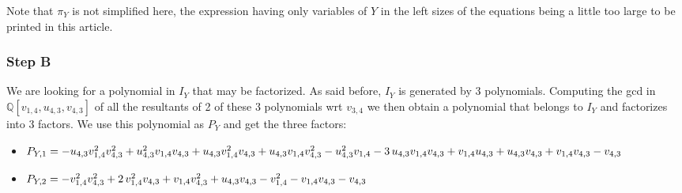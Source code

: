 Note that $\pi_{Y}$ is not simplified here, the expression having only
variables of $Y$ in the left sizes of the equations being a little too large
to be printed in this article.

\subsubsection{{\bf Step B}}

We are looking for a polynomial in $I_Y$ that may be factorized. As said before, $I_Y$ is generated by $3$ polynomials. Computing the gcd in $\mathbb{Q} [ v_{1,4} ,u_{4,3} ,v_{4,3} ]$ of all the resultants of 2 of these $3$ polynomials wrt $v_{3,4}$ we then obtain a
polynomial that belongs to $I_{Y}$ and factorizes into $3$ factors. We use this polynomial as $P_{Y}$ and get the three factors:
\begin{itemize}
  \item {\small{$P_{Y,1} =-u_{4,3} v_{1,4}^{2} v_{4,3}^{2} +u_{4,3}^{2} v_{1,4}
  v_{4,3} +u_{4,3} v_{1,4}^{2} v_{4,3} +u_{4,3} v_{1,4} v_{4,3}^{2}
  -u_{4,3}^{2} v_{1,4} -3 \hspace{0.17em} u_{4,3} v_{1,4} v_{4,3} +v_{1,4}
  u_{4,3} +u_{4,3} v_{4,3} +v_{1,4} v_{4,3} -v_{4,3}$}}
  
  \item {\small{$P_{Y,2} =-v_{1,4}^{2} v_{4,3}^{2} +2 \hspace{0.17em}
  v_{1,4}^{2} v_{4,3} +v_{1,4} v_{4,3}^{2} +u_{4,3} v_{4,3} -v_{1,4}^{2}
  -v_{1,4} v_{4,3} -v_{4,3}$}}
  

\end{itemize}
